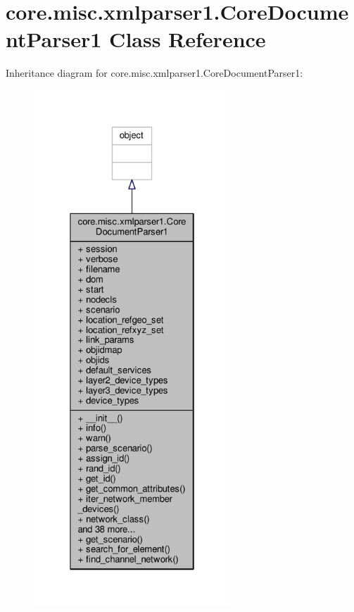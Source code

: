 \hypertarget{classcore_1_1misc_1_1xmlparser1_1_1_core_document_parser1}{\section{core.\+misc.\+xmlparser1.\+Core\+Document\+Parser1 Class Reference}
\label{classcore_1_1misc_1_1xmlparser1_1_1_core_document_parser1}
}


Inheritance diagram for core.\+misc.\+xmlparser1.\+Core\+Document\+Parser1\+:
\nopagebreak
\begin{figure}[H]
\begin{center}
\leavevmode
\includegraphics[height=550pt]{classcore_1_1misc_1_1xmlparser1_1_1_core_document_parser1__inherit__graph}
\end{center}
\end{figure}


